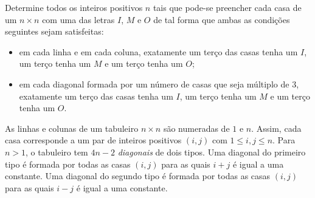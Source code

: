 Determine todos os inteiros positivos $n$ tais que pode-se preencher cada casa de um $n \times n$ com uma das letras $I$, $M$ e $O$ de tal forma que ambas as condições seguintes sejam satisfeitas:
\begin{itemize}
	\item em cada linha e em cada coluna, exatamente um terço das casas tenha um $I$, um terço tenha um $M$ e um terço tenha um $O$;
	\item em cada diagonal formada por um número de casas que seja múltiplo de $3$, exatamente um terço das casas tenha um $I$, um terço tenha um $M$ e um terço tenha um $O$.
\end{itemize}

\begin{rem}
	As linhas e colunas de um tabuleiro $n \times n$ são numeradas de $1$ e $n$. Assim, cada casa corresponde a um par de inteiros positivos $(i,j)$ com $1 \le i,j \le n$. Para $n > 1$, o tabuleiro tem $4n-2$ \emph{diagonais} de dois tipos. Uma diagonal do primeiro tipo é formada por todas as casas $(i,j)$ para as quais $i+j$ é igual a uma constante. Uma diagonal do segundo tipo é formada por todas as casas $(i,j)$ para as quais $i-j$ é igual a uma constante.
\end{rem}
